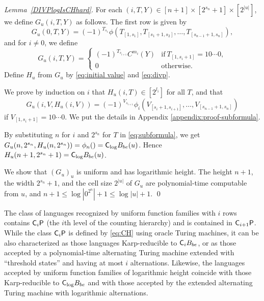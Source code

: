 \begin{proof}[Lemma~\ref{DIVPlogIsCHhard}]
For each $(i, T, Y) \in [n+1] \times [2^{s_n}+1] \times [2^{|u|}]$,
we define $G_u (i, T, Y)$ as follows.
The first row is given by
 \begin{equation}\label{eq:def-Gu:case0}
  G_u(0,T,Y) = 
   (-1)^{T_{s_1}}\phi(T_{[1,s_1]}, T_{[s_1+1,s_2]},
    \dots, T_{[s_{n-1}+1,s_n]}), 
 \end{equation}
and for $i \neq 0$, we define 
 \begin{equation} 
  G_u(i,T,Y) = 
   \begin{cases}
    (-1)^{T_{s_{i+1}}} C^{m_i}(Y) 
    & \text{if} \ T_{[1,s_i+1]} = 10 \cdots 0, \\
    0 & \text{otherwise}.
   \end{cases} 
   \label{eq:def-Gu:case-nonzero}
 \end{equation}
Define $H_u$ from $G_u$ by \eqref{eq:initial value} and \eqref{eq:divp}.

We prove by induction on $i$ that $H_u(i, T) \in [2^{l_i}]$ for all $T$, and that 
 \begin{equation} \label{eq:subformula}
  G_u(i,V,H_u(i,V)) = (-1)^{V_{s_{i+1}}} 
   \phi_i(V_{[s_i+1, s_{i+1}]}, \dots, V_{[s_{n-1}+1, s_n]})
 \end{equation}
if $V_{[1, s_i +1]} = 10 \cdots 0$.
We put the details in Appendix \ref{appendix:proof-subformula}.

By substituting $n$ for $i$ and $2^{s_n}$ for $T$ in \eqref{eq:subformula},
we get $G_u(n, 2^{s_n}, H_u(n,2^{s_n})) = \phi_n() = \mathsf{C}_{\log} B_{be}(u)$.
Hence $H_u(n+1, 2^{s_n}+1) = \mathsf{C}_{\log} B_{be}(u)$.
 
We show that $(G_u)_u$ is uniform and has logarithmic height. 
The height $n+1$, the width $2^{s_n}+1$, and the cell size $2^{|u|}$
of $G_u$ are polynomial-time computable from $u$, 
and $n+1 \le \log |0^{2^n}| + 1 \le \log|u| + 1$.
\qed
\end{proof}


The class of languages recognized by uniform function families with $i$ rows
contains $\mathsf{C}_i \mathsf{P}$ (the $i$th level of the counting hierarchy)
and is contained in $\mathsf{C}_{i+1} \mathsf{P}$.
While the class $\mathsf{C}_i \mathsf{P}$ is defined by \eqref{eq:CH} using oracle Turing machines,
it can be also characterized as those languages Karp-reducible to $\mathsf{C}_i B_{be}$, or 
as those accepted by a polynomial-time alternating Turing machine 
extended with ``threshold states'' and having at most $i$ alternations.
Likewise, 
the languages accepted by uniform function families of logarithmic height
coincide with those Karp-reducible to $\mathsf{C}_{\log} B_{be}$
and with those accepted by the extended alternating Turing machine with logarithmic alternations.



